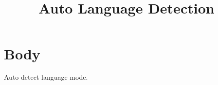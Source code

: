 \documentclass[lang=auto]{SUSTechHomework}
\title{Auto Language Detection}
\begin{document}
\maketitle
\section{Body}
Auto-detect language mode.
\end{document}
